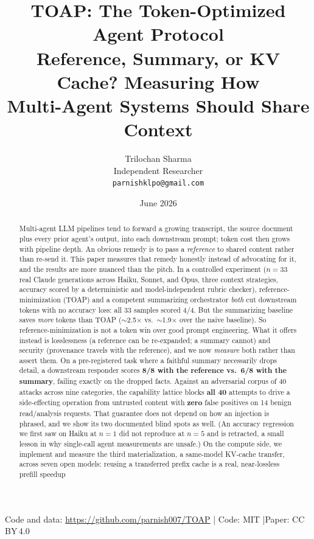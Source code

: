\documentclass[11pt]{article}
\title{\textbf{TOAP: The Token-Optimized Agent Protocol}\\[2mm]
\textbf{\large Reference, Summary, or KV Cache? Measuring How}\\
\textbf{\large Multi-Agent Systems Should Share Context}}
\author{Trilochan Sharma \\ Independent Researcher \\ \texttt{parnishklpo@gmail.com}}
\date{June 2026}
\begin{document}
\sloppy
\maketitle

\begin{center}\small
Code and data: \url{https://github.com/parnish007/TOAP} \quad|\quad
Code: MIT \quad|\quad Paper: CC\,BY\,4.0
\end{center}

\begin{abstract}
Multi-agent LLM pipelines tend to forward a growing transcript, the source document plus every prior
agent's output, into each downstream prompt; token cost then grows with pipeline depth. An obvious
remedy is to pass a \emph{reference} to shared content rather than re-send it. This paper measures that
remedy honestly instead of advocating for it, and the results are more nuanced than the pitch.
In a controlled experiment ($n{=}33$ real Claude generations across Haiku, Sonnet, and Opus, three
context strategies, accuracy scored by a deterministic and model-independent rubric checker),
reference-minimization (TOAP) and a competent summarizing orchestrator \emph{both} cut downstream tokens
with no accuracy loss: all 33 samples scored 4/4. But the summarizing baseline saves \emph{more} tokens
than TOAP ($\sim$2.5$\times$ vs.\ $\sim$1.9$\times$ over the naive baseline). So reference-minimization is
not a token win over good prompt engineering. What it offers instead is losslessness (a reference can be
re-expanded; a summary cannot) and security (provenance travels with the reference), and we now
\emph{measure} both rather than assert them. On a pre-registered task where a faithful summary
necessarily drops detail, a downstream responder scores \textbf{8/8 with the reference vs.\ 6/8 with the
summary}, failing exactly on the dropped facts. Against an adversarial corpus of 40 attacks across
nine categories, the capability lattice blocks \textbf{all 40} attempts to drive a side-effecting
operation from untrusted content with \textbf{zero} false positives on 14 benign read/analysis
requests. That guarantee does not depend on how an injection is phrased, and we show its two documented
blind spots as well. (An accuracy regression we first saw on Haiku at $n{=}1$ did not reproduce at
$n{=}5$ and is retracted, a small lesson in why single-call agent measurements are unsafe.) On the
compute side, we implement and measure the third materialization, a same-model KV-cache transfer,
across seven open models: reusing a transferred prefix cache is a real, near-lossless prefill speedup

\end{abstract}
\end{document}
